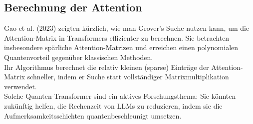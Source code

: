 \subsection{Berechnung der Attention}
Gao et al. (2023) zeigten kürzlich, wie man Grover’s Suche nutzen kann, um die Attention-Matrix in Transformers effizienter zu berechnen. Sie betrachten insbesondere spärliche Attention-Matrizen und erreichen einen polynomialen Quantenvorteil gegenüber klassischen Methoden.\\
Ihr Algorithmus berechnet die relativ kleinen (sparse) Einträge der Attention-Matrix schneller, indem er Suche statt vollständiger Matrixmultiplikation verwendet.\\
Solche Quanten-Transformer sind ein aktives Forschungsthema: Sie könnten zukünftig helfen, die Rechenzeit von LLMs zu reduzieren, indem sie die Aufmerksamkeitsschichten quantenbeschleunigt umsetzen.



\printbibliography
